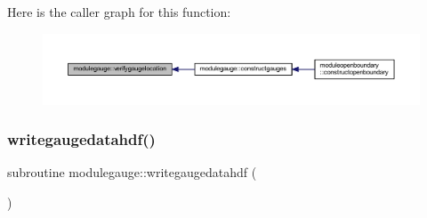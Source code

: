 Here is the caller graph for this function\+:\nopagebreak
\begin{figure}[H]
\begin{center}
\leavevmode
\includegraphics[width=350pt]{namespacemodulegauge_a5143391f003e2c838204ca20768435a4_icgraph}
\end{center}
\end{figure}
\mbox{\label{namespacemodulegauge_a473e631b98b7b3cb869f4ede62f77425}} 
\subsubsection{\texorpdfstring{writegaugedatahdf()}{writegaugedatahdf()}}
{\footnotesize\ttfamily subroutine modulegauge\+::writegaugedatahdf (\begin{DoxyParamCaption}{ }\end{DoxyParamCaption})\hspace{0.3cm}{\ttfamily [private]}}

